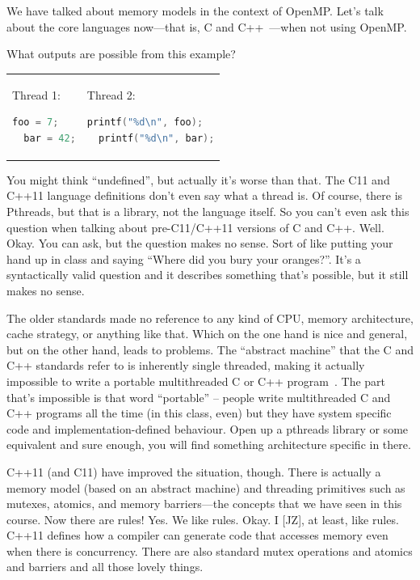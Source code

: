 \documentclass[a4paper]{report}
\begin{document}
We have talked about memory models in the context of OpenMP. Let's
talk about the core languages now---that is, C and C++~\cite{quora:cppthr, cppconcurrency}---when
not using OpenMP.

What outputs are possible from this example?

\begin{tabular}{ll}
      \begin{minipage}{.2\textwidth}
        Thread 1:
        \begin{lstlisting}[language=C]
  foo = 7;
  bar = 42;
        \end{lstlisting}
      \end{minipage} &
      \begin{minipage}{.4\textwidth}
        Thread 2:
        \begin{lstlisting}[language=C]
  printf("%d\n", foo);
  printf("%d\n", bar);
        \end{lstlisting}
      \end{minipage}
\end{tabular}

You might think ``undefined'', but actually it's worse than that. The 
C11 and C++11 language definitions don't even say what a thread is.
Of course, there is Pthreads, but that is a library, not the language itself.
So you can't even ask this question when talking about pre-C11/C++11 versions
of C and C++. Well. Okay. You can ask, but the question makes no sense. Sort of like
putting your hand up in class and saying ``Where did you bury your oranges?''.
It's a syntactically valid question and it describes something that's possible,
but it still makes no sense.

The older standards made no reference to any kind of CPU, memory architecture, cache
strategy, or anything like that. Which on the one hand is nice and general, but on the other hand, leads to problems. The ``abstract machine'' that the C and C++ standards refer to is inherently single threaded, making it actually impossible to write a portable multithreaded C or C++ program~\cite{quora:cppthr}. The part that's impossible is that word ``portable'' -- people write multithreaded C and C++ programs all the time (in this class, even) but they have system specific code and implementation-defined behaviour. Open up a pthreads library or some equivalent and sure enough, you will find something architecture specific in there.

C++11 (and C11) have improved the situation, though. There is actually
a memory model (based on an abstract machine) and threading primitives
such as mutexes, atomics, and memory barriers---the concepts that we
have seen in this course. Now there are rules! Yes. We like rules. Okay. I [JZ], at least, like rules. C++11 defines how a compiler can generate code that accesses memory even when there is concurrency. There are also standard mutex operations and atomics and barriers and all those lovely things.
\end{document}
